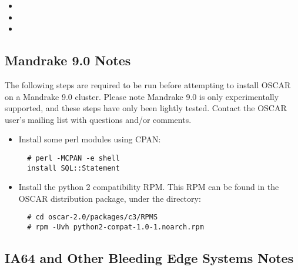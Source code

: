\begin{itemize}
  \begin{itemize}
  \item {}
  \item {}
  \item {}
  \end{itemize}

\end{itemize}


\subsection{Mandrake 9.0 Notes}
\label{subsec:mdk90notes}

The following steps are required to be run before attempting to
install OSCAR on a Mandrake 9.0 cluster.  Please note Mandrake 9.0 is
only experimentally supported, and these steps have only been lightly
tested.  Contact the OSCAR user's mailing list with questions and/or
comments.

\begin{itemize}
\item Install some perl modules using CPAN:

\begin{verbatim}
  # perl -MCPAN -e shell
  install SQL::Statement
\end{verbatim}
  
\item Install the python 2 compatibility RPM.  This RPM can be found
  in the OSCAR distribution package, under the 
  directory:

\begin{verbatim}
  # cd oscar-2.0/packages/c3/RPMS
  # rpm -Uvh python2-compat-1.0-1.noarch.rpm
\end{verbatim}

\end{itemize}


\subsection{IA64 and Other Bleeding Edge Systems Notes}
\label{subsec:ia64notes}

